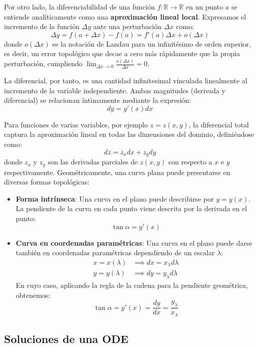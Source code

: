 Por otro lado, la diferenciabilidad de una función $f: \mathbb{R} \to \mathbb{R}$ en un punto $a$ se entiende analíticamente como una \textbf{aproximación lineal local}. Expresamos el incremento de la función $\Delta y$ ante una perturbación $\Delta x$ como:
$$ \Delta y = f(a + \Delta x) - f(a) = f'(a)\Delta x + o(\Delta x) $$
donde $o(\Delta x)$ es la notación de Landau para un infinitésimo de orden superior, es decir, un error topológico que decae a cero más rápidamente que la propia perturbación, cumpliendo $\lim_{\Delta x \to 0} \frac{o(\Delta x)}{\Delta x} = 0$. 

La diferencial, por tanto, es una cantidad infinitesimal vinculada linealmente al incremento de la variable independiente. Ambas magnitudes (derivada y diferencial) se relacionan íntimamente mediante la expresión:
$$ dy = y'(x) dx $$

Para funciones de varias variables, por ejemplo $z = z(x,y)$, la diferencial total captura la aproximación lineal en todas las dimensiones del dominio, definiéndose como:
$$ dz = z_x dx + z_y dy $$
donde $z_x$ y $z_y$ son las derivadas parciales de $z(x,y)$ con respecto a $x$ e $y$ respectivamente. Geométricamente, una curva plana puede presentarse en diversas formas topológicas:

\begin{itemize}
    \item \textbf{Forma intrínseca}: Una curva en el plano puede describirse por $y = y(x)$. La pendiente de la curva en cada punto viene descrita por la derivada en el punto:
    $$ \tan \alpha = y'(x) $$
    
    \item \textbf{Curva en coordenadas paramétricas}: Una curva en el plano puede darse también en coordenadas paramétricas dependiendo de un escalar $\lambda$:
    \begin{align*}
        x = x(\lambda) &\implies dx = x_\lambda d\lambda \\
        y = y(\lambda) &\implies dy = y_\lambda d\lambda
    \end{align*}
    En cuyo caso, aplicando la regla de la cadena para la pendiente geométrica, obtenemos:
    $$ \tan \alpha = y'(x) = \frac{dy}{dx} = \frac{y_\lambda}{x_\lambda} $$
\end{itemize}

\subsection{Soluciones de una ODE}

